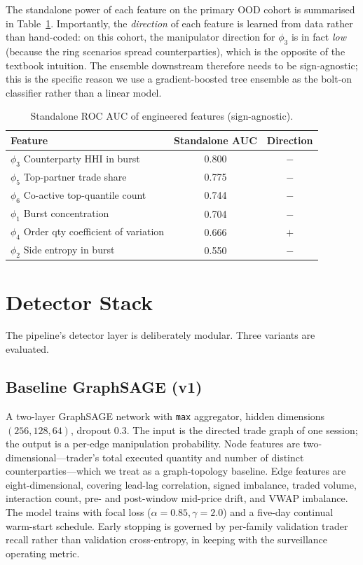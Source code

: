 \documentclass[10pt,twocolumn,letterpaper]{article}
\begin{document}
The standalone power of each feature on the primary OOD cohort is
summarised in Table~\ref{tab:standalone}. Importantly, the
\emph{direction} of each feature is learned from data rather than
hand-coded: on this cohort, the manipulator direction for
\(\phi_3\) is in fact \emph{low} (because the ring scenarios spread
counterparties), which is the opposite of the textbook intuition. The
ensemble downstream therefore needs to be sign-agnostic; this is the
specific reason we use a gradient-boosted tree ensemble as the bolt-on
classifier rather than a linear model.

\begin{table}[t]
\caption{Standalone ROC AUC of engineered features (sign-agnostic).}
\label{tab:standalone}
\centering
\footnotesize
\begin{tabular}{lcc}
\toprule
Feature & Standalone AUC & Direction \\
\midrule
$\phi_3$ Counterparty HHI in burst & 0.800 & $-$ \\
$\phi_5$ Top-partner trade share & 0.775 & $-$ \\
$\phi_6$ Co-active top-quantile count & 0.744 & $-$ \\
$\phi_1$ Burst concentration & 0.704 & $-$ \\
$\phi_4$ Order qty coefficient of variation & 0.666 & $+$ \\
$\phi_2$ Side entropy in burst & 0.550 & $-$ \\
\bottomrule
\end{tabular}
\end{table}

\section{Detector Stack}
\label{sec:detector}

The pipeline's detector layer is deliberately modular. Three variants
are evaluated.

\subsection{Baseline GraphSAGE (v1)}
A two-layer GraphSAGE network with \texttt{max} aggregator, hidden
dimensions \((256,128,64)\), dropout \(0.3\). The input is the directed
trade graph of one session; the output is a per-edge manipulation
probability. Node features are two-dimensional---trader's total
executed quantity and number of distinct counterparties---which we
treat as a graph-topology baseline. Edge features are
eight-dimensional, covering lead-lag correlation, signed imbalance,
traded volume, interaction count, pre- and post-window mid-price drift,
and VWAP imbalance. The model trains with focal loss
(\(\alpha{=}0.85,\gamma{=}2.0\)) and a five-day continual warm-start
schedule. Early stopping is governed by per-family validation trader
recall rather than validation cross-entropy, in keeping with the
surveillance operating metric.
\end{document}
